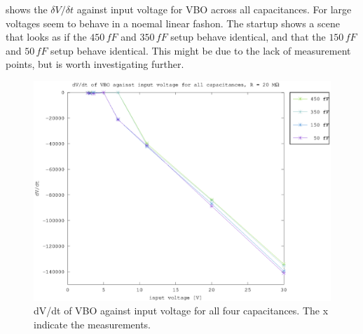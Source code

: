 \documentclass{article}
\begin{document}
 shows the $\delta V/\delta t$ against input voltage for VBO across all capacitances. For large voltages seem to behave in a noemal linear fashon. The startup shows a scene that looks as if the $450\,fF$ and $350\,fF$ setup behave identical, and that the $150\,fF$ and $50\,fF$ setup behave identical. This might be due to the lack of measurement points, but is worth investigating further.



\begin{figure}[h]
	    \centering
	    \includegraphics[width=\textwidth]{fig/vbo_vin_vs_time_sat.eps}
	    \caption[]%
	    {dV/dt of VBO against input voltage for all four capacitances. The x indicate the measurements.}    
	    \label{fig:vbo_e_vs_m}	
\end{figure}





\clearpage
\end{document}

